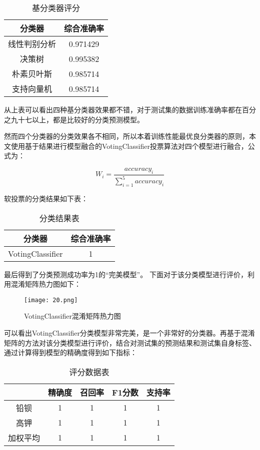 \begin{table}[H]
	\centering
	\begin{tabular}{c c} 
		\toprule[1.5pt]
		分类器 & 综合准确率 \\
		\midrule[1pt]
		线性判别分析 & 0.971429 \\
		决策树 & 0.995382 \\
		朴素贝叶斯 & 0.985714 \\
		支持向量机 & 0.985714 \\
		\toprule[1.5pt]
	\end{tabular}
\caption{基分类器评分}
\end{table}

从上表可以看出四种基分类器效果都不错，对于测试集的数据训练准确率都在百分之九十七以上，都是比较好的分类预测模型。

然而四个分类器的分类效果各不相同，所以本着训练性能最优良分类器的原则，本文使用基于结果进行模型融合的VotingClassifier投票算法对四个模型进行融合，公式为：


\begin{equation}
    {{W}_{i}}=\frac{accurac{{y}_{i}}}{\sum\limits_{i=1}^{5}{accurac{{y}_{i}}}}
\end{equation}

软投票的分类结果如下表：

\begin{table}[H]
	\centering
	\begin{tabular}{c c} 
		\toprule[1.5pt]
		分类器 & 综合准确率 \\
		\midrule[1pt]
		VotingClassifier & 1 \\
		\toprule[1.5pt]
	\end{tabular}
\caption{分类结果表}
\end{table}

最后得到了分类预测成功率为1的“完美模型”。
下面对于该分类模型进行评价，利用混淆矩阵热力图如下：


\begin{figure}[H] 
	\centering %
	\texttt{[image: 20.png]} %
	\caption{VotingClassifier混淆矩阵热力图} %
	\label{Fig.main21} %
\end{figure}


可以看出VotingClassifier分类模型非常完美，是一个非常好的分类器。再基于混淆矩阵的方法对该分类模型进行评价，结合对测试集的预测结果和测试集自身标签、通过计算得到模型的精确度得到如下指标：

\begin{table}[H]
	\centering
	\begin{tabular}{c c c c c} 
		\toprule[1.5pt]
		 & 精确度 & 召回率 & F1分数 & 支持率 \\
        \midrule[1pt]
		铅钡 & 1 & 1 & 1 & 1 \\
		\hline
		高钾 & 1 & 1 & 1 & 1 \\
		\hline
		加权平均 & 1 & 1 & 1 & 1 \\
		\toprule[1.5pt]
	\end{tabular}
\caption{评分数据表}
\end{table}

